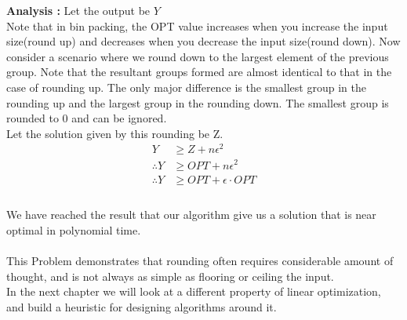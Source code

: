 \documentclass[12pt]{report}
\begin{document}
\textbf{Analysis :}
Let the output be $Y$ \\
Note that in bin packing, the OPT value increases when you increase the input size(round up) and decreases when you decrease the input size(round down).
Now consider a scenario where we round down to the largest element of the previous group. Note that the resultant groups formed are almost identical to that in the case of rounding up. The only major difference is the smallest group in the rounding up and the largest group in the rounding down. The smallest group is rounded to 0 and can be ignored.\\
Let the solution given by this rounding be Z.\\
\begin{align*}
Y &\geq Z + n\epsilon ^2 \\
\therefore  Y &\geq OPT + n\epsilon ^2 \\
\therefore  Y &\geq OPT + \epsilon \cdot OPT \\
\end{align*} \\
We have reached the result that our algorithm give us a solution that is near optimal in polynomial time. \\\\

This Problem demonstrates that rounding often requires considerable amount of thought, and is not always as simple as flooring or ceiling the input. \\
In the next chapter we will look at a different property of linear optimization, and build a heuristic for designing algorithms around it.

 

\end{document}
